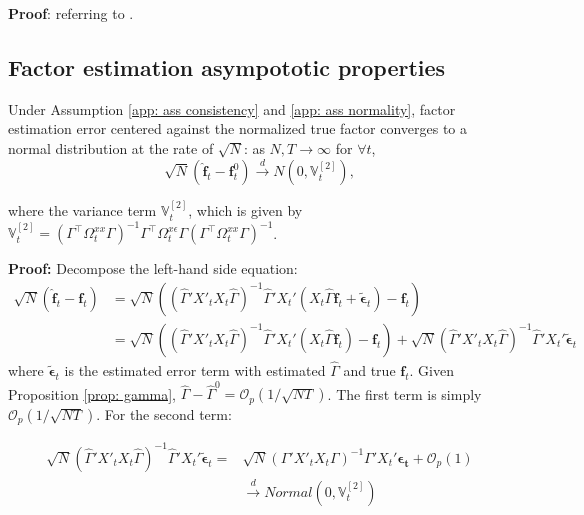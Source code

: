 \documentclass[12pt]{article}
\begin{document}
\textbf{Proof}: referring to \cite{kelly2020instrumented}.
\subsection{Factor estimation asympototic properties}
\begin{proposition}
\label{prop: factor}
Under Assumption \ref{app: ass consistency} and \ref{app: ass normality}, factor estimation error centered against the normalized true factor converges to a normal distribution at the rate of $\sqrt{N}$: as $N, T \to \infty$ for $\forall t$,
$$
\sqrt{N}\left(\hat{\bm{f}}_t - \bm{f}^0_t\right) \xrightarrow{d} N\left(0, \mathbb{V}_t^{[2]}\right),
$$
\end{proposition}
where the variance term $\mathbb{V}_{t}^{[2]}$, which is given by $\mathbb{V}_{t}^{[2]} = \left( \Gamma^\top \Omega_{t}^{xx} \Gamma\right)^{-1} \Gamma^\top \Omega_{t}^{x\epsilon} \Gamma \left(\Gamma^\top\Omega_{t}^{xx} \Gamma\right)^{-1}$.

\textbf{Proof:} Decompose the left-hand side equation:
\begin{equation*}
\begin{aligned}
\sqrt{N}\left(\bm{\hat{f}}_t - \bm{f}_t\right) &= \sqrt{N}\left(\left( \hat{\Gamma}'X'_tX_t\hat{\Gamma} \right)^{-1}\hat{\Gamma}'X_t' \left(X_t\hat{\Gamma}\bm{f}_t+ \bm{\tilde{\epsilon}}_t \right) - \bm{f}_t\right)\\
&= \sqrt{N}\left(\left( \hat{\Gamma}'X'_tX_t\hat{\Gamma} \right)^{-1}\hat{\Gamma}'X_t' \left(X_t \hat{\Gamma}\bm{f}_t\right) - \bm{f}_t\right) + \sqrt{N}\left( \hat{\Gamma}'X'_tX_t\hat{\Gamma} \right)^{-1}\hat{\Gamma}'X_t'\bm{\tilde{\epsilon}}_t
\end{aligned}
\end{equation*}
where $\bm{\tilde{\epsilon}}_t$ is the estimated error term with estimated $\hat\Gamma$ and true $\bm{f}_t$. Given Proposition \ref{prop: gamma}, $\hat{\Gamma} - \hat{\Gamma}^0 = \mathcal{O}_p \left( 1/\sqrt{NT} \right)$. The first term is simply $\mathcal{O}_p\left(1/\sqrt{NT}\right)$. For the second term:

\begin{equation*}
\begin{aligned}
\sqrt{N}\left( \hat{\Gamma}'X'_tX_t\hat{\Gamma} \right)^{-1}\hat{\Gamma}'X_t'\bm{\tilde{\epsilon}}_t = &\sqrt{N}\left( \Gamma'X'_tX_t\Gamma \right)^{-1}\Gamma'X_t'\bm{\epsilon_t} + \mathcal{O}_p(1) \\
& \xrightarrow{d} Normal(0, \mathbb{V}_t^{[2]})
\end{aligned}
\end{equation*}
\end{document}
